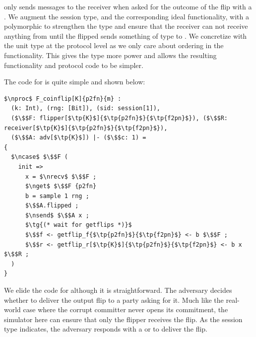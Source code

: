 \Fflip only sends messages to the receiver when asked for the outcome of the flip with a . 
We augment the session type, and the corresponding ideal functionality, with a polymorphic  to strengthen the type and ensure that the receiver can not receive anything from  until the flipped sends something of type  to \Fflip.
We concretize  with the unit type \inline{()} at the protocol level as we only care about ordering in the functionality. 
This gives the type more power and allows the resulting functionality and protocol code to be simpler. 

The code for \Fflip is quite simple and shown below:
\begin{lstlisting}[basicstyle=\footnotesize\BeraMonottFamily, frame=single, mathescape]
$\nproc$ F_coinflip[K]{p2fn}{m} :
  (k: Int), (rng: [Bit]), (sid: session[1]),
  ($\$$F: flipper[$\tp{K}$]{$\tp{p2fn}$}{$\tp{f2pn}$}), ($\$$R: receiver[$\tp{K}$]{$\tp{p2fn}$}{$\tp{f2pn}$}),
  ($\$$A: adv[$\tp{K}$]) |- ($\$$c: 1) =
{
  $\ncase$ $\$$F (
    init =>
      x = $\nrecv$ $\$$F ;
      $\nget$ $\$$F {p2fn}
      b = sample 1 rng ;
      $\$$A.flipped ;
      $\nsend$ $\$$A x ;
      $\tg{(* wait for getflips *)}$
      $\$$f <- getflip_f{$\tp{p2fn}$}{$\tp{f2pn}$} <- b $\$$F ;
      $\$$r <- getflip_r[$\tp{K}$]{$\tp{p2fn}$}{$\tp{f2pn}$} <- b x $\$$R ;
  )
}
\end{lstlisting}
We elide the code for  although it is straightforward. 
The adversary decides whether to deliver the output flip to a party asking for it.
Much like the real-world case where the corrupt committer never opens its commitment, the simulator here can ensure that only the flipper receives the flip.
As the session type indicates, the adversary responds with a  or  to deliver the flip.


